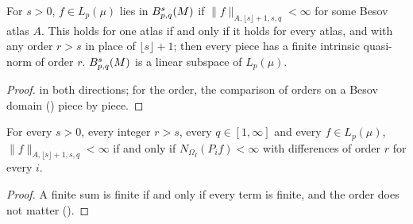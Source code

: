 \begin{definition}
\label{def:manifold-besov}
\leanok
{}
For $s > 0$, $f \in L_p(\mu)$ lies in $B^{s}_{p,q}(M)$ if $\|f\|_{A, \lfloor s \rfloor + 1, s,
q} < \infty$ for some Besov atlas $A$. This holds for one atlas if and only if it holds for every
atlas, and with any order $r > s$ in place of $\lfloor s \rfloor + 1$; then every piece has a
finite intrinsic quasi-norm of order $r$. $B^{s}_{p,q}(M)$ is a linear subspace of
$L_p(\mu)$.
\end{definition}

\begin{proof}
\leanok
{} in both directions; for the order, the comparison of orders on a
Besov domain () piece by piece.
\end{proof}

\begin{lemma}
\label{lem:manifold-besov-pieces}
\leanok
{}
For every $s > 0$, every integer $r > s$, every $q \in [1, \infty]$ and every
$f \in L_p(\mu)$, $\|f\|_{A, \lfloor s \rfloor + 1, s, q} < \infty$ if and only if
$N_{\Omega_I}(P_i f) < \infty$ with differences of order $r$ for every $i$.
\end{lemma}

\begin{proof}
\leanok
A finite sum is finite if and only if every term is finite, and the order does not matter
().
\end{proof}

